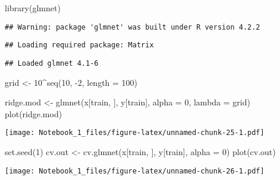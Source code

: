\documentclass[
]{article}
\newenvironment{Shaded}{\begin{snugshade}}{\end{snugshade}}
\newcommand{\AttributeTok}[1]{\textcolor[rgb]{0.77,0.63,0.00}{#1}}
\newcommand{\DecValTok}[1]{\textcolor[rgb]{0.00,0.00,0.81}{#1}}
\newcommand{\FunctionTok}[1]{\textcolor[rgb]{0.00,0.00,0.00}{#1}}
\newcommand{\NormalTok}[1]{#1}
\newcommand{\OtherTok}[1]{\textcolor[rgb]{0.56,0.35,0.01}{#1}}
\newcommand{\SpecialCharTok}[1]{\textcolor[rgb]{0.00,0.00,0.00}{#1}}
\begin{document}
\begin{Shaded}
\begin{Highlighting}[]
\FunctionTok{library}\NormalTok{(glmnet)}
\end{Highlighting}
\end{Shaded}

\begin{verbatim}
## Warning: package 'glmnet' was built under R version 4.2.2
\end{verbatim}

\begin{verbatim}
## Loading required package: Matrix
\end{verbatim}

\begin{verbatim}
## Loaded glmnet 4.1-6
\end{verbatim}

\begin{Shaded}
\begin{Highlighting}[]
\NormalTok{grid }\OtherTok{\textless{}{-}} \DecValTok{10}\SpecialCharTok{\^{}}\FunctionTok{seq}\NormalTok{(}\DecValTok{10}\NormalTok{, }\SpecialCharTok{{-}}\DecValTok{2}\NormalTok{, }\AttributeTok{length =} \DecValTok{100}\NormalTok{)}
\end{Highlighting}
\end{Shaded}

\begin{Shaded}
\begin{Highlighting}[]
\NormalTok{ridge.mod }\OtherTok{\textless{}{-}} \FunctionTok{glmnet}\NormalTok{(x[train, ], y[train], }\AttributeTok{alpha =} \DecValTok{0}\NormalTok{, }\AttributeTok{lambda =}\NormalTok{ grid)}
\FunctionTok{plot}\NormalTok{(ridge.mod)}
\end{Highlighting}
\end{Shaded}

\texttt{[image: Notebook\_1\_files/figure-latex/unnamed-chunk-25-1.pdf]}

\begin{Shaded}
\begin{Highlighting}[]
\FunctionTok{set.seed}\NormalTok{(}\DecValTok{1}\NormalTok{)}
\NormalTok{cv.out }\OtherTok{\textless{}{-}} \FunctionTok{cv.glmnet}\NormalTok{(x[train, ], y[train], }\AttributeTok{alpha =} \DecValTok{0}\NormalTok{)}
\FunctionTok{plot}\NormalTok{(cv.out)}
\end{Highlighting}
\end{Shaded}

\texttt{[image: Notebook\_1\_files/figure-latex/unnamed-chunk-26-1.pdf]}
\end{document}

